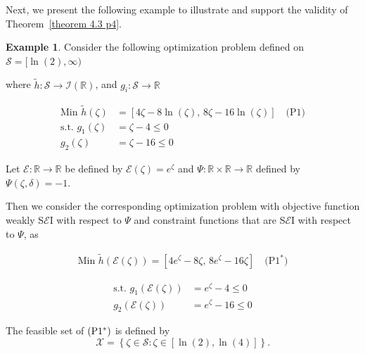 \documentclass[12pt, reqno]{amsart}
\theoremstyle{definition}
\newtheorem{example}{Example}[section]
\theoremstyle{remark}
\numberwithin{equation}{section}
\begin{document}
Next, we present the following example to illustrate and support the validity of Theorem~\ref{theorem 4.3 p4}.
\begin{example}
    Consider the following optimization problem defined on $\mathcal{S} = [\ln(2), \infty)$

\noindent where $\tilde{h} : \mathcal{S} \to \mathcal{I}(\mathbb{R})$, and $g_i : \mathcal{S} \to \mathbb{R}$

\begin{equation*}
\begin{aligned}
\text{Min } \tilde{h}(\mathit{\zeta} ) &= \left[ 4\mathit{\zeta}  - 8\ln(\mathit{\zeta} ),\, 8\mathit{\zeta}  - 16\ln(\mathit{\zeta} ) \right] \quad \text{(P1)} \\
\text{s.t. } g_1(\mathit{\zeta} ) &= \mathit{\zeta}  - 4 \leq 0 \\
g_2(\mathit{\zeta} ) &= \mathit{\zeta}  - 16 \leq 0
\end{aligned}
\end{equation*}

Let $\mathcal{\mathcal{E}} : \mathbb{R} \to \mathbb{R}$ be defined by $\mathcal{\mathcal{E}}(\mathit{\zeta} ) = e^{\mathit{\zeta} }$ and $\Psi : \mathbb{R} \times \mathbb{R} \to \mathbb{R}$ defined by $\Psi(\mathit{\zeta} ,\mathit{\delta} ) = -1$.

Then we consider the corresponding optimization problem with objective function weakly S$\mathcal{\mathcal{E}}$I with respect to $\Psi$ and constraint functions that are S$\mathcal{\mathcal{E}}$I with respect to $\Psi$, as

\begin{equation*}
   \begin{aligned}
        \text{Min } \tilde{h}(\mathcal{\mathcal{E}}(\mathit{\zeta} )) =
[4e^{\mathit{\zeta} } - 8\mathit{\zeta} ,\, 8e^{\mathit{\zeta} } - 16\mathit{\zeta} ] \quad \text{(P1$^*$)}
   \end{aligned}
\end{equation*}

\begin{equation*}
    \begin{aligned}
        \text{s.t. } g_1(\mathcal{\mathcal{E}}(\mathit{\zeta} )) &= e^{\mathit{\zeta} } - 4 \leq 0 \\
g_2(\mathcal{\mathcal{E}}(\mathit{\zeta} )) &= e^{\mathit{\zeta} } - 16 \leq 0
    \end{aligned}
\end{equation*}

The feasible set of $(\rm P1^*)$ is defined by
\begin{equation*}
    \mathcal{X} = \left\{ \mathit{\zeta}  \in \mathcal{S} : \mathit{\zeta}  \in [\ln(2), \ln(4)] \right\}.
\end{equation*}


\end{example}
\end{document}
